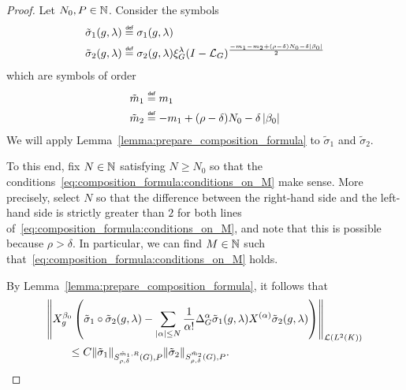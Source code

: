 \begin{proof}
    Let $N_0, P \in \mathbb{N}$.
    Consider the symbols
    \begin{align*}
        \tilde \sigma_1(g, \lambda) &\defeq \sigma_1(g, \lambda)\\
        \tilde \sigma_2(g, \lambda) &\defeq \sigma_2(g, \lambda) \Rep \lambda \BesselPotential {-m_1 - m_2 + (\rho - \delta) N_0 - \delta \abs {\beta_0}}\\
    \end{align*}
    which are symbols of order
    \begin{align*}
        \tilde m_1 &\defeq m_1\\
        \tilde m_2 &\defeq -m_1 + (\rho - \delta) N_0 - \delta \abs {\beta_0}
    \end{align*}
    We will apply Lemma~\ref{lemma:prepare_composition_formula} to $\tilde \sigma_1$ and $\tilde \sigma_2$.

    To this end,
    fix $N \in \mathbb{N}$ satisfying $N \geq N_0$ so that the conditions~\eqref{eq:composition_formula:conditions_on_M} make sense.
    More precisely,
    select $N$ so that the difference between the right-hand side and the left-hand side is strictly greater than $2$ for both lines of~\eqref{eq:composition_formula:conditions_on_M},
    and note that this is possible because $\rho > \delta$.
    In particular,
    we can find $M \in \mathbb{N}$ such that~\eqref{eq:composition_formula:conditions_on_M} holds.

    By Lemma~\ref{lemma:prepare_composition_formula},
    it follows that
    \begin{align*}
        &\norm [\Lin {\Lebesgue 2 \CompactGroup}] {%
        \LeftDifferentialOperator [g] {\beta_0}
        \left(
                \tilde \sigma_1 \circ \tilde \sigma_2(g, \lambda)
                - \sum_{\abs \alpha \leq N} \frac 1 {\alpha!} \DifferenceOperatorOrder \alpha \tilde \sigma_1(g, \lambda) \TaylorLeftDifferentialOperator \alpha \tilde \sigma_2(g, \lambda)
            \right)
        }\\
        &\qquad \leq C \SymbolSemiNorm {\tilde m_1, R} {\rho, \delta} P {\tilde \sigma_1} \SymbolSemiNorm {\tilde m_2} {\rho, \delta} P {\tilde \sigma_2}.
    \end{align*}


\end{proof}
